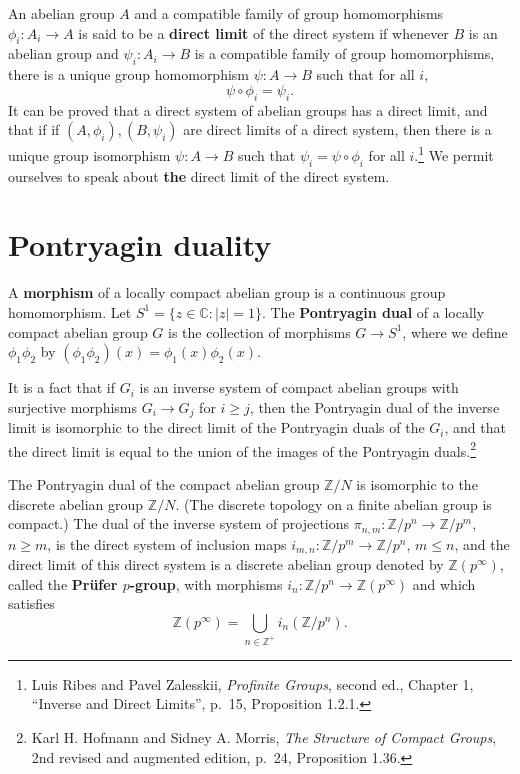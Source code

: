 \documentclass{article}
\theoremstyle{definition}
\begin{document}
An abelian group $A$ and a compatible family of group homomorphisms $\phi_i:A_i \to A$ is said to be a \textbf{direct limit} of the direct system
if whenever $B$ is an abelian group and $\psi_i:A_i \to B$ is a compatible family of group homomorphisms, there is a unique 
group homomorphism $\psi:A \to B$ such that for all $i$,
\[
\psi \circ \phi_i = \psi_i.
\]
It can be proved that a direct system of abelian groups has a direct limit, and that if
if $(A,\phi_i),(B,\psi_i)$ are direct limits of a direct system, 
then there is a unique group isomorphism $\psi:A \to B$ such that
$\psi_i  = \psi \circ \phi_i$ for all $i$.\footnote{Luis Ribes and Pavel Zalesskii, {\em Profinite Groups}, second ed., Chapter 1, ``Inverse and Direct Limits'', p.~15,
Proposition 1.2.1.}
We
permit ourselves to speak about \textbf{the} direct limit of the direct system.


\section{Pontryagin duality}
A \textbf{morphism} of a locally compact abelian group is a continuous group homomorphism.
Let $S^1=\{z \in \mathbb{C}: |z|=1\}$. The \textbf{Pontryagin dual} of a locally compact abelian group $G$
is the collection of morphisms $G \to S^1$, where we define
$\phi_1 \phi_2$ by $(\phi_1 \phi_2)(x)=\phi_1(x)\phi_2(x)$. 

It is a fact that
if $G_i$ is an inverse system of compact abelian groups with surjective morphisms $G_i \to G_j$ for $i \geq j$, then 
the Pontryagin dual of the inverse limit is isomorphic to the direct limit of the Pontryagin duals of the $G_i$, and that the
direct limit is equal to the union of the images of the Pontryagin duals.\footnote{Karl H. Hofmann and Sidney A. Morris,
{\em The Structure of Compact Groups}, 2nd revised and augmented edition, p.~24, Proposition 1.36.}

The Pontryagin dual of the compact abelian group $\mathbb{Z}/N$ is isomorphic to the discrete abelian group $\mathbb{Z}/N$. (The discrete
topology on a finite abelian group is compact.) The dual of the inverse system  of projections
$\pi_{n,m}:\mathbb{Z}/p^n \to \mathbb{Z}/p^m$, $n \geq m$, is the direct system of inclusion maps
 $i_{m,n}:\mathbb{Z}/p^m \to \mathbb{Z}/p^n$, $m \leq n$, and the 
 direct limit of this direct system is a discrete abelian group denoted by $\mathbb{Z}(p^\infty)$, called the \textbf{Pr\"ufer $p$-group}, with morphisms $i_n:\mathbb{Z}/p^n \to \mathbb{Z}(p^\infty)$ and which satisfies
  \[
 \mathbb{Z}(p^\infty) = \bigcup_{n \in \mathbb{Z}^+} i_n(\mathbb{Z}/p^n).
 \]
 
\end{document}
